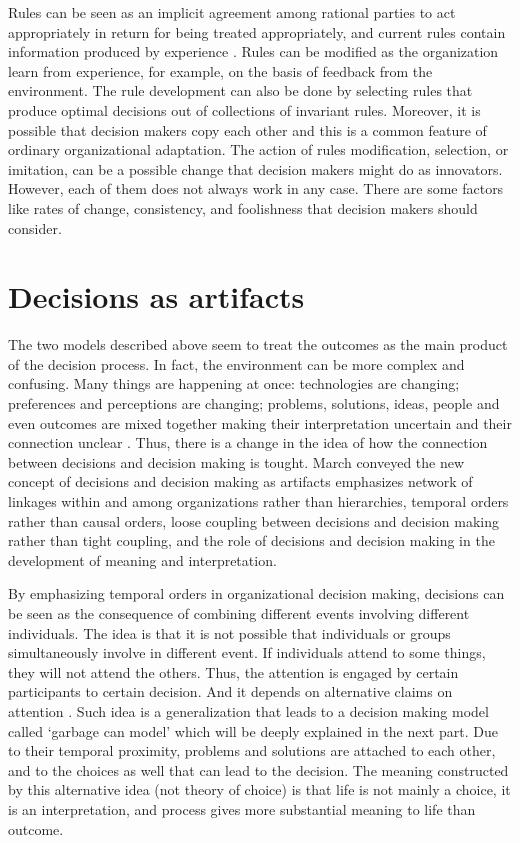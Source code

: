 Rules can be seen as an implicit agreement among rational parties to act appropriately in return for being treated appropriately, and current rules contain information produced by experience \cite{2}. Rules can be modified as the organization learn from experience, for example, on the basis of feedback from the environment. The rule development can also be done by selecting rules that produce optimal decisions out of collections of invariant rules. Moreover, it is possible that decision makers copy each other and this is a common feature of ordinary organizational adaptation. The action of rules modification, selection, or imitation, can be a possible change that decision makers might do as innovators. However, each of them does not always work in any case. There are some factors like rates of change, consistency, and foolishness that decision makers should consider.

\section{Decisions as artifacts}

The two models described above seem to treat the outcomes as the main product of the decision process. In fact, the environment can be more complex and confusing. Many things are happening at once: technologies are changing; preferences and perceptions are changing; problems, solutions, ideas, people and even outcomes are mixed together making their interpretation uncertain and their connection unclear \cite{2}. Thus, there is a change in the idea of how the connection between decisions and decision making is tought. March conveyed the new concept of decisions and decision making as artifacts emphasizes network of linkages within and among organizations rather than hierarchies, temporal orders rather than causal orders, loose coupling between decisions and decision making rather than tight coupling, and the role of decisions and decision making in the development of meaning and interpretation.

By emphasizing temporal orders in organizational decision making, decisions can be seen as the consequence of combining different events involving different individuals. The idea is that it is not possible that individuals or groups simultaneously involve in different event. If individuals attend to some things, they will not attend the others. Thus, the attention is engaged by certain participants to certain decision. And it depends on alternative claims on attention \cite{2}. Such idea is a generalization that leads to a decision making model called ‘garbage can model’ which will be deeply explained in the next part. Due to their temporal proximity, problems and solutions are attached to each other, and to the choices as well that can lead to the decision. The meaning constructed by this alternative idea (not theory of choice) is that life is not mainly a choice, it is an interpretation, and process gives more substantial meaning to life than outcome.

